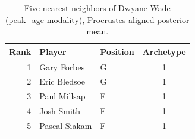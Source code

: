 \begin{table}[htbp]
  \centering\small
  \begin{tabular}{rllc}
    \toprule
    Rank & Player & Position & Archetype \\
    \midrule
    1 & Gary Forbes & G & 1 \\
    2 & Eric Bledsoe & G & 1 \\
    3 & Paul Millsap & F & 1 \\
    4 & Josh Smith & F & 1 \\
    5 & Pascal Siakam & F & 1 \\
    \bottomrule
  \end{tabular}
  \caption{Five nearest neighbors of Dwyane Wade (peak_age modality), Procrustes-aligned posterior mean.}
  \label{tab:Dwyane_Wade_neighbors_peak_age}
\end{table}

